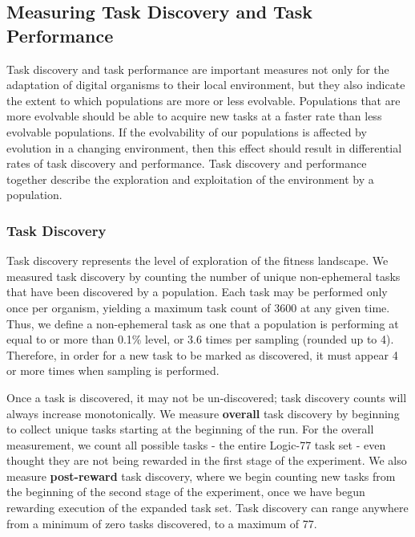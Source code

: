 \documentclass[PhD]{msu-thesis}
\begin{document}
\subsection{Measuring Task Discovery and Task Performance}
Task discovery and task performance are important measures not only for the adaptation of digital organisms to their local environment, but they also indicate the extent to which populations are more or less evolvable. Populations that are more evolvable should be able to acquire new tasks at a faster rate than less evolvable populations. If the evolvability of our populations is affected by evolution in a changing environment, then this effect should result in differential rates of task discovery and performance. Task discovery and performance together describe the exploration and exploitation of the environment by a population. 

\subsubsection{Task Discovery}
Task discovery represents the level of exploration of the fitness landscape. We measured task discovery by counting the number of unique non-ephemeral tasks that have been discovered by a population. Each task may be performed only once per organism, yielding a maximum task count of 3600 at any given time. Thus, we define a non-ephemeral task as one that a population is performing at equal to or more than 0.1\% level, or 3.6 times per sampling (rounded up to 4). Therefore, in order for a new task to be marked as discovered, it must appear 4 or more times when sampling is performed.

Once a task is discovered, it may not be un-discovered; task discovery counts will always increase monotonically. We measure \textbf{overall} task discovery by beginning to collect unique tasks starting at the beginning of the run. For the overall measurement, we count all possible tasks - the entire Logic-77 task set - even thought they are not being rewarded in the first stage of the experiment. We also measure \textbf{post-reward} task discovery, where we begin counting new tasks from the beginning of the second stage of the experiment, once we have begun rewarding execution of the expanded task set. 
Task discovery can range anywhere from a minimum of zero tasks discovered, to a maximum of 77.
\end{document}
